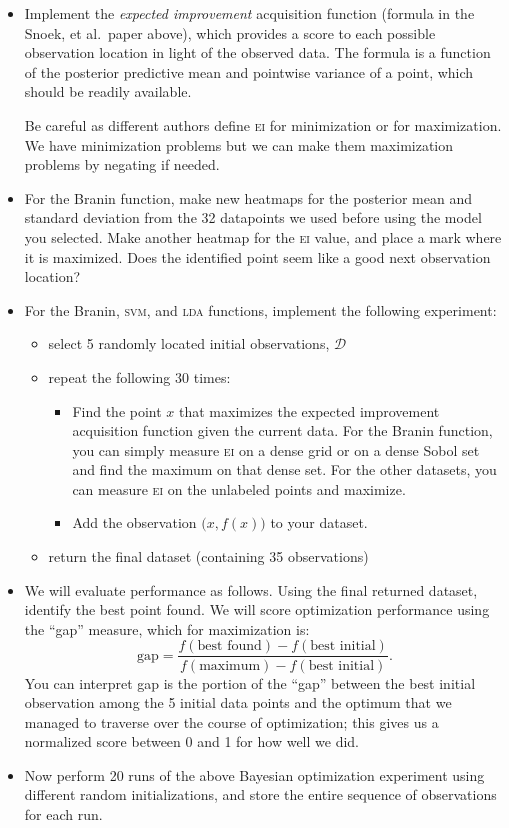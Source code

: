 \documentclass{article}
\newcommand{\acro}[1]{\textsc{\MakeLowercase{#1}}}
\newcommand{\mc}[1]{\mathcal{#1}}
\newcommand{\data}{\mc{D}}
\begin{document}
\begin{itemize}
\item
  Implement the \emph{expected improvement} acquisition function (formula in the
  Snoek, et al.\ paper above), which provides a score to each possible
  observation location in light of the observed data. The formula is a function
  of the posterior predictive mean and pointwise variance of a point, which
  should be readily available.

  Be careful as different authors define \acro{EI} for minimization or for
  maximization. We have minimization problems but we can make them maximization
  problems by negating if needed.
\item
  For the Branin function, make new heatmaps for the posterior mean and standard
  deviation from the 32 datapoints we used before using the model you selected.
  Make another heatmap for the \acro{EI} value, and place a mark where it is
  maximized. Does the identified point seem like a good next observation location?
\item
  For the Branin, \acro{SVM}, and \acro{LDA} functions, implement the following
  experiment:
  \begin{itemize}
  \item
    select 5 randomly located initial observations, $\data$
  \item
    repeat the following 30 times:
    \begin{itemize}
    \item
      Find the point $x$ that maximizes the expected improvement acquisition
      function given the current data. For the Branin function, you can simply
      measure \acro{EI} on a dense grid or on a dense Sobol set and find the
      maximum on that dense set.  For the other datasets, you can measure
      \acro{EI} on the unlabeled points and maximize.
    \item
      Add the observation $\bigl(x, f(x)\bigr)$ to your dataset.
    \end{itemize}
  \item
    return the final dataset (containing 35 observations)
  \end{itemize}
\item
  We will evaluate performance as follows. Using the final returned dataset,
  identify the best point found. We will score optimization performance using
  the ``gap'' measure, which for maximization is:
  \[
  \text{gap} = \frac{f(\text{best found}) - f(\text{best initial})}{f(\text{maximum}) - f(\text{best initial})}.
  \]
  You can interpret gap is the portion of the ``gap'' between the best initial
  observation among the 5 initial data points and the optimum that we managed to
  traverse over the course of optimization; this gives us a normalized score
  between 0 and 1 for how well we did.
\item
  Now perform 20 runs of the above Bayesian optimization experiment using
  different random initializations, and store the entire sequence of
  observations for each run.


\end{itemize}
\end{document}
